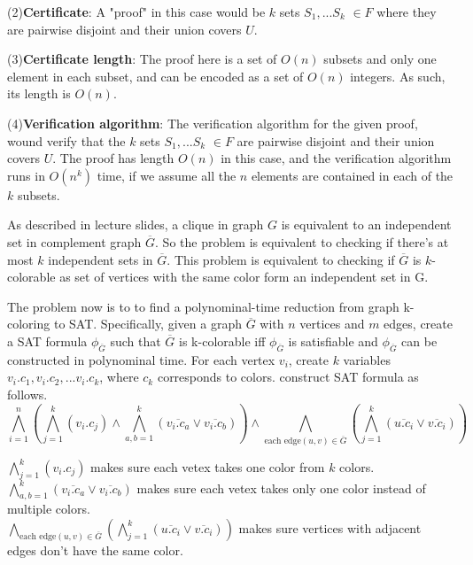 \documentclass[12pt,a4paper]{article}
\newcommand{\question}[1]{\bigskip\noindent{\textbf{Q{#1} solution}}}
\begin{document}
(2)\textbf{Certificate}: A "proof" in this case would be $k$ sets $S_1, ... S_k$ $\in F$ where they are pairwise disjoint and their union covers $U$.

(3)\textbf{Certificate length}: The proof here is a set of $O(n)$ subsets and only one element in each subset, and can be encoded as a set of $O(n)$ integers. As such, its length is $O(n)$.

(4)\textbf{Verification algorithm}: The verification algorithm for the given proof, wound verify that the $k$ sets $S_1, ... S_k$ $\in F$ are pairwise disjoint and their union covers $U$.
The proof has length $O(n)$ in this case, and the verification algorithm runs in $O(n^k)$ time, if we assume all the $n$ elements are contained in each of the $k$ subsets.

\question{32.A}

As described in lecture slides, a clique in graph $G$ is equivalent to an independent set in complement graph $\overline{G}$. So the problem is equivalent to checking if there's at most $k$ independent sets in $\overline{G}$. This problem is equivalent to checking if $\overline{G}$ is $k$-colorable as set of vertices with the same color form an independent set in G. 

The problem now is to to find a polynominal-time reduction from graph k-coloring to SAT. Specifically, given a graph $\overline{G}$ with $n$ vertices and $m$ edges, create a SAT formula $\phi_{\overline{G}}$ such that $\overline{G}$ is k-colorable iff $\phi_{\overline{G}}$ is satisfiable and $\phi_{\overline{G}}$ can be constructed in polynominal time. For each vertex $v_i$, create $k$ variables $v_i.c_1,v_i.c_2,...v_i.c_k$, where $c_k$ corresponds to colors. construct SAT formula as follows.
\begin{equation*}
	\bigwedge_{i=1}^{n} (\bigwedge_{j=1}^{k}(v_i.c_j) \wedge \bigwedge_{a,b=1}^{k} (\overline{v_i.c_a} \vee \overline{v_i.c_b})) \wedge \bigwedge_{\mbox{each edge} (u,v) \in \overline{G}}( \bigwedge_{j=1}^{k}(\overline{u.c_i} \vee \overline{v.c_i}))
\end{equation*}

\noindent
$\bigwedge_{j=1}^{k}(v_i.c_j)$ makes sure each vetex takes one color from $k$ colors. \\
$\bigwedge_{a,b=1}^{k} (\overline{v_i.c_a} \vee \overline{v_i.c_b})$ makes sure each vetex takes only one color instead of multiple colors. \\
$\bigwedge_{\mbox{each edge} (u,v) \in \overline{G}}( \bigwedge_{j=1}^{k}(\overline{u.c_i} \vee \overline{v.c_i}))$ makes sure vertices with adjacent edges don't have the same color.
\end{document}

